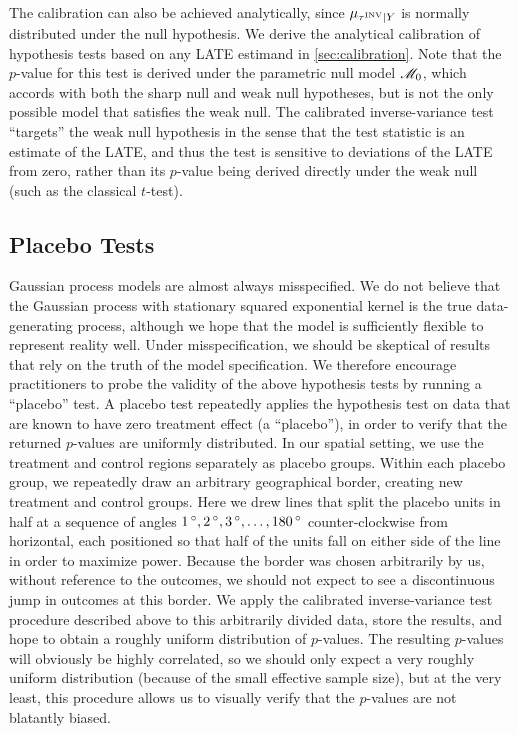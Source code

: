 \documentclass[12pt]{article}
\begin{document}
The calibration can also be achieved analytically, since \(\mu_{\tau^{\mathrm{INV}} \mid Y}\) is normally distributed under the null hypothesis.
We derive the analytical calibration of hypothesis tests based on any LATE estimand in \autoref{sec:calibration}.
Note that the \(p\)-value for this test is derived under the parametric null model \(\mathscr{M}_0\), which accords with both the sharp null and weak null hypotheses, but is not the only possible model that satisfies the weak null.
The calibrated inverse-variance test “targets” the weak null hypothesis in the sense that the test statistic is an estimate of the LATE, and thus the test is sensitive to deviations of the LATE from zero, rather than its \(p\)-value being derived directly under the weak null (such as the classical \(t\)-test).

\label{eq:calib_test}

\subsection{Placebo Tests}
\label{sec:placebo}
Gaussian process models are almost always misspecified.
We do not believe that the Gaussian process with stationary squared exponential kernel is the true data-generating process, although we hope that the model is sufficiently flexible to represent reality well.
Under misspecification, we should be skeptical of results that rely on the truth of the model specification.
We therefore encourage practitioners to probe the validity of the above hypothesis tests by running a ``placebo'' test.
A placebo test repeatedly applies the hypothesis test on data that are known to have zero treatment effect (a ``placebo''),
in order to verify that the returned \(p\)-values are uniformly distributed.
In our spatial setting, we use the treatment and control regions separately as placebo groups.
Within each placebo group, we repeatedly draw an arbitrary geographical border, creating new treatment and control groups.
Here we drew lines that split the placebo units in half at a sequence of angles \(1{\,^\circ},2{\,^\circ},3{\,^\circ},\dotsc,180{\,^\circ}\) counter-clockwise from horizontal, each positioned so that half of the units fall on either side of the line in order to maximize power.
Because the border was chosen arbitrarily by us, without reference to the outcomes, we should not expect to see a discontinuous jump in outcomes at this border.
We apply the calibrated inverse-variance test procedure described above to this arbitrarily divided data, store the results, and hope to obtain a roughly uniform distribution of \(p\)-values.
The resulting \(p\)-values will obviously be highly correlated, so we should only expect a very roughly uniform distribution (because of the small effective sample size), but at the very least, this procedure allows us to visually verify that the \(p\)-values are not blatantly biased.
\end{document}
